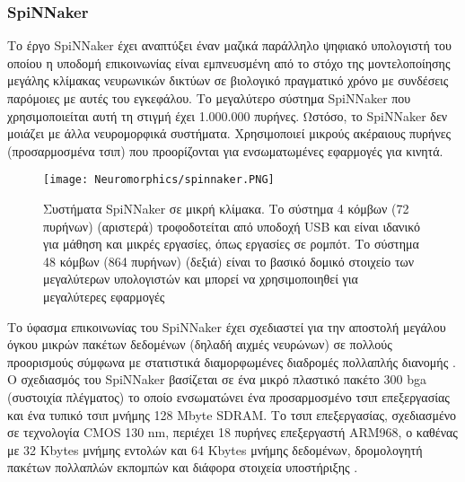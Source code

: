 \documentclass[12pt]{report}
\begin{document}
\subsubsection{\textlatin{SpiNNaker}}
Το έργο \textlatin{SpiNNaker} \cite{furber2014} έχει αναπτύξει έναν μαζικά παράλληλο ψηφιακό υπολογιστή του οποίου η υποδομή επικοινωνίας είναι εμπνευσμένη από το στόχο της μοντελοποίησης μεγάλης κλίμακας νευρωνικών δικτύων σε βιολογικό πραγματικό χρόνο με συνδέσεις παρόμοιες με αυτές του εγκεφάλου. Το μεγαλύτερο σύστημα \textlatin{SpiNNaker} που χρησιμοποιείται αυτή τη στιγμή έχει 1.000.000 πυρήνες. Ωστόσο, το \textlatin{SpiNNaker} δεν μοιάζει με άλλα νευρομορφικά συστήματα. Χρησιμοποιεί μικρούς ακέραιους πυρήνες (προσαρμοσμένα τσιπ) που προορίζονται για ενσωματωμένες εφαρμογές για κινητά. 
\begin{figure}[htp]
    \centering
    \texttt{[image: Neuromorphics/spinnaker.PNG]}
    \caption{Συστήματα \textlatin{SpiNNaker} σε μικρή κλίμακα. Το σύστημα 4 κόμβων (72 πυρήνων) (αριστερά) τροφοδοτείται από υποδοχή USB και είναι ιδανικό για μάθηση και μικρές εργασίες, όπως εργασίες σε ρομπότ. Το σύστημα 48 κόμβων (864 πυρήνων) (δεξιά) είναι το βασικό δομικό στοιχείο των μεγαλύτερων υπολογιστών και μπορεί να χρησιμοποιηθεί για μεγαλύτερες εφαρμογές}
    \label{fig:spinnaker}
\end{figure}

Το ύφασμα επικοινωνίας του \textlatin{SpiNNaker} έχει σχεδιαστεί για την αποστολή μεγάλου όγκου μικρών πακέτων δεδομένων (δηλαδή αιχμές νευρώνων) σε πολλούς προορισμούς σύμφωνα με στατιστικά διαμορφωμένες διαδρομές πολλαπλής διανομής \cite{plana2011}.
Ο σχεδιασμός του \textlatin{SpiNNaker} βασίζεται σε ένα μικρό πλαστικό πακέτο 300 \textlatin{bga} (συστοιχία πλέγματος) το οποίο ενσωματώνει ένα προσαρμοσμένο τσιπ επεξεργασίας και ένα τυπικό τσιπ μνήμης 128 \textlatin{Mbyte SDRAM}. Το τσιπ επεξεργασίας, σχεδιασμένο σε τεχνολογία \textlatin{CMOS 130 nm}, περιέχει 18 πυρήνες επεξεργαστή \textlatin{ARM968}, ο καθένας με 32 \textlatin{Kbytes} μνήμης εντολών και 64 \textlatin{Kbytes} μνήμης δεδομένων, δρομολογητή πακέτων πολλαπλών εκπομπών και διάφορα στοιχεία υποστήριξης \cite{painkras2013} \cite{furber2016 }.
\end{document}
